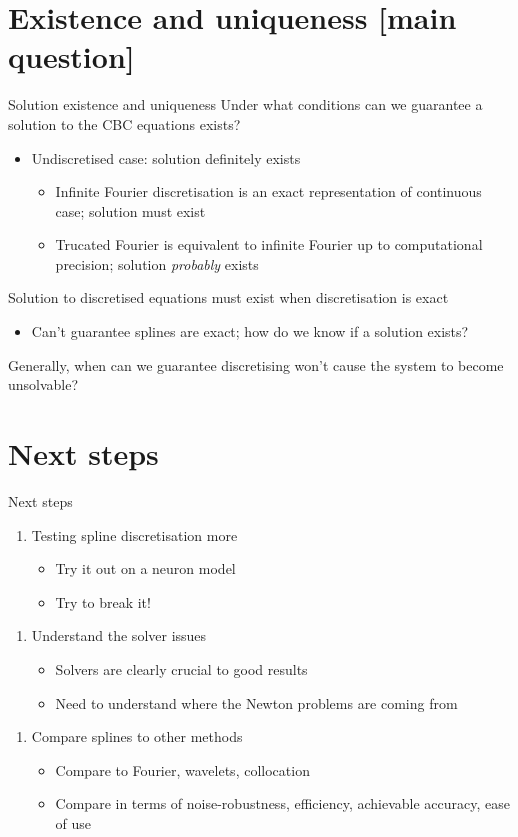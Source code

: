 \documentclass[presentation]{beamer}
\begin{document}
\section{Existence and uniqueness [main question]}
\label{sec:orgec175d5}
\begin{frame}[label={sec:org9954c77}]{Solution existence and uniqueness}
Under what conditions can we guarantee a solution to the CBC equations exists?
\begin{itemize}
\item Undiscretised case: solution definitely exists
\begin{itemize}
\item Infinite Fourier discretisation is an exact representation of continuous case; solution must exist
\item Trucated Fourier is equivalent to infinite Fourier up to computational precision; solution \emph{probably} exists
\end{itemize}
\end{itemize}
\vfill
Solution to discretised equations must exist when discretisation is exact
\begin{itemize}
\item Can't guarantee splines are exact; how do we know if a solution exists?
\end{itemize}
\vfill
Generally, when can we guarantee discretising won't cause the system to become unsolvable?
\end{frame}

\section{Next steps}
\label{sec:org642c013}
\begin{frame}[label={sec:org2906932}]{Next steps}
\begin{enumerate}
\item Testing spline discretisation more
\begin{itemize}
\item Try it out on a neuron model
\item Try to break it!
\end{itemize}
\end{enumerate}
\vfill
\begin{enumerate}
\item Understand the solver issues
\begin{itemize}
\item Solvers are clearly crucial to good results
\item Need to understand where the Newton problems are coming from
\end{itemize}
\end{enumerate}
\vfill
\begin{enumerate}
\item Compare splines to other methods
\begin{itemize}
\item Compare to Fourier, wavelets, collocation
\item Compare in terms of noise-robustness, efficiency, achievable accuracy, ease of use
\end{itemize}
\end{enumerate}
\end{frame}
\end{document}
